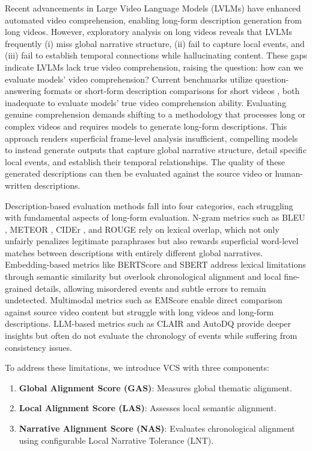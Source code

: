 \documentclass[main.tex]{subfiles}
\begin{document}
Recent advancements in Large Video Language Models (LVLMs) \cite{Yuan2025Tarsier2,Shen2025LongVU,Ataallah2024Goldfish,Chen2025LongVILA} have enhanced automated video comprehension, enabling long-form description generation from long videos. However, exploratory analysis on long videos reveals that LVLMs frequently (i) miss global narrative structure, (ii) fail to capture local events, and (iii) fail to establish temporal connections while hallucinating content. These gaps indicate LVLMs lack true video comprehension, raising the question: how can we evaluate models' video comprehension? Current benchmarks utilize question-answering formats \cite{wu2024longvideobench,ataallah2024infinibench,nagrani2025neptune} or short-form description comparisons for short videos \cite{wyzs:24,chen:acl11,ZhXuCoAAAI18}, both inadequate to evaluate models' true video comprehension ability. Evaluating genuine comprehension demands shifting to a methodology that processes long or complex videos and requires models to generate long-form descriptions. This approach renders superficial frame-level analysis insufficient, compelling models to instead generate outputs that capture global narrative structure, detail specific local events, and establish their temporal relationships. The quality of these generated descriptions can then be evaluated against the source video or human-written descriptions.

Description-based evaluation methods fall into four categories, each struggling with fundamental aspects of long-form evaluation. N-gram metrics such as BLEU \cite{p:02}, METEOR \cite{bl:05}, CIDEr \cite{v:15}, and ROUGE \cite{l:04} rely on lexical overlap, which not only unfairly penalizes legitimate paraphrases but also rewards superficial word-level matches between descriptions with entirely different global narratives. Embedding-based metrics like BERTScore \cite{z:20} and SBERT \cite{r:19} address lexical limitations through semantic similarity but overlook chronological alignment and local fine-grained details, allowing misordered events and subtle errors to remain undetected. Multimodal metrics such as EMScore \cite{syxl:22} enable direct comparison against source video content but struggle with long videos and long-form descriptions. LLM-based metrics such as CLAIR \cite{chan:23} and AutoDQ \cite{wyzs:24} provide deeper insights but often do not evaluate the chronology of events while suffering from consistency issues.

To address these limitations, we introduce VCS with three components:
\begin{enumerate}
\item \textbf{Global Alignment Score (GAS)}: Measures global thematic alignment.
\item \textbf{Local Alignment Score (LAS)}: Assesses local semantic alignment.
\item \textbf{Narrative Alignment Score (NAS)}: Evaluates chronological alignment using configurable Local Narrative Tolerance (LNT).
\end{enumerate}
\end{document}

